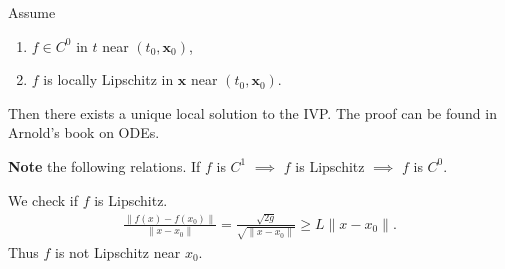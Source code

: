 \begin{theorem}[Picard]
	Assume 
	\begin{enumerate}
		\item  $f \in C^0$ in $t$ near $(t_0,  \textbf{x}_0)$,
		\item $f$ is locally Lipschitz in $ \textbf{x}$ near $(t_0,  \textbf{x}_0)$.
	\end{enumerate}
	Then there exists a unique local solution to the IVP. The proof can be found in Arnold's book on ODEs. 	
\end{theorem}
\textbf{Note} the following relations. If $f$ is $C^1$ $\implies$ $f $ is Lipschitz $\implies $ $f$ is $C^0$.
\begin{ex}
	We check if $f$ is Lipschitz.
	\begin{align}
		\frac{ \| f(x) - f(x_0)  \|}{ \|x-x_0 \|} = \frac{\sqrt{2g}}{\sqrt{ \|x-x_0 \|}} \geq  L  \| x - x_0 \|.
	\end{align}
Thus $f$ is not Lipschitz near $x_0$.	
\end{ex}

